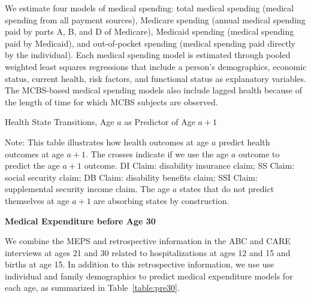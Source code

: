 \noindent We estimate four models of medical spending: total medical spending (medical spending from all payment sources), Medicare spending (annual medical spending paid by parts A, B, and D of Medicare), Medicaid spending (medical spending paid by Medicaid), and out-of-pocket spending (medical spending paid directly by the individual). Each medical spending model is estimated through pooled weighted least squares regressions that include a person’s demographics, economic status, current health, risk factors, and functional status as explanatory variables. The MCBS-based medical spending models also include lagged health because of the length of time for which MCBS subjects are observed.

\begin{table}
\begin{threeparttable}
\caption{Health State Transitions, Age $a$ as Predictor of Age $a+1$}\label{table:transition}
\scriptsize

\begin{tablenotes}
\footnotesize
\item Note: This table illustrates how health outcomes at age $a$ predict health outcomes at age $a+1$. The crosses indicate if we use the age $a$ outcome to predict the age $a+1$ outcome. DI Claim: disability insurance claim; SS Claim: social security claim; DB Claim: disability benefits claim; SSI Claim: supplemental security income claim. The age $a$ states that do not predict themselves at age $a+1$ are absorbing states by construction.
\end{tablenotes}
\end{threeparttable}
\end{table}

\noindent \textbf{Medical Expenditure before Age 30}

\noindent We combine the MEPS and retrospective information in the ABC and CARE interviews at ages 21 and 30 related to hospitalizations at ages 12 and 15 and births at age 15. In addition to this retrospective information, we use use individual and family demographics to predict medical expenditure models for each age, as summarized in Table~\ref{table:pre30}.\\


